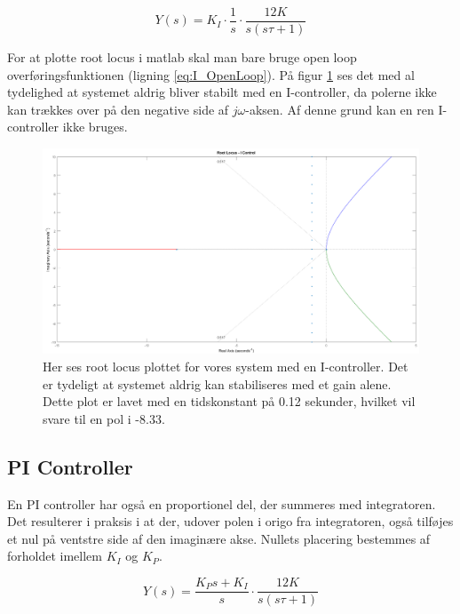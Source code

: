 \begin{equation}\label{eq:I_OpenLoop}
Y(s)=K_{I}\cdot\frac{1}{s}\cdot\frac{12K}{s(s\tau+1)}
\end{equation}

For at plotte root locus i matlab skal man bare bruge open loop overføringsfunktionen (ligning \ref{eq:I_OpenLoop}). På figur \ref{fig:I_rlocus} ses det med al tydelighed at systemet aldrig bliver stabilt med en I-controller, da polerne ikke kan trækkes over på den negative side af $j\omega$-aksen. Af denne grund kan en ren I-controller ikke bruges.

\begin{figure}[ht]
	\begin{center}
		\includegraphics[scale=0.35]{Billeder/I_rlocus.PNG}
	\end{center}
\caption{Her ses root locus plottet for vores system med en I-controller. Det er tydeligt at systemet aldrig kan stabiliseres med et gain alene. Dette plot er lavet med en tidskonstant på 0.12 sekunder, hvilket vil svare til en pol i -8.33.}
\label{fig:I_rlocus}
\end{figure}

\subsection{PI Controller}

En PI controller har også en proportionel del, der summeres med integratoren. Det resulterer i praksis i at der, udover polen i origo fra integratoren, også tilføjes et nul på ventstre side af den imaginære akse. Nullets placering bestemmes af forholdet imellem $K_{I}$ og $K_{P}$.

\begin{equation}\label{PI_OpenLoop}
Y(s)=\frac{K_{P}s+K_{I}}{s}\cdot\frac{12K}{s(s\tau+1)}
\end{equation}

